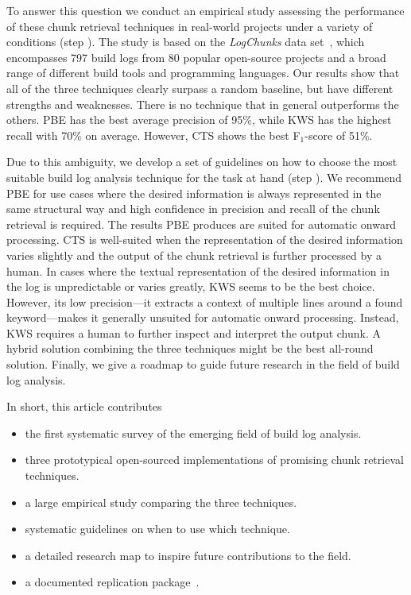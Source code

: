 To answer this question
we conduct an empirical study assessing the performance
of these chunk retrieval techniques in
real-world projects under a variety of conditions (step ).
The study is based on the \emph{LogChunks} data
set~\cite{brandt2020logchunks}, which encompasses 797 build logs from
80 popular open-source projects and a broad range of different
build tools and programming languages.
Our results show that all of the three techniques
clearly surpass a random baseline, but have different strengths and weaknesses. There is no technique that in general outperforms
the others.
PBE has the best average precision of 95\%, while KWS has the highest
recall with 70\% on average.
However, CTS shows the best F$_{1}$-score
of 51\%. 

Due to this ambiguity, we develop a set of guidelines
on how to choose the most suitable build log analysis
technique for the task at hand (step ).
We recommend PBE for use cases where the desired information is always
represented in the same structural way and high confidence in
precision and recall of the chunk retrieval is required.
The results PBE produces are suited for automatic onward processing.
CTS is
well-suited when the representation of the desired information varies
slightly and the output of the chunk retrieval is further processed by
a human.
In cases where the textual representation of the desired
information in the log is unpredictable or varies greatly, KWS seems
to be the best choice.
However, its low precision---it extracts a
context of multiple lines around a found keyword---makes it generally
unsuited for automatic onward processing.
Instead, KWS requires a human
to further inspect and interpret the output chunk.
A hybrid solution combining the three techniques might be the best
all-round solution.
Finally, we give a roadmap to guide future research in the field
of build log analysis.

In short, this article contributes
\begin{itemize}
\item the first systematic survey of the emerging field of build log
analysis.
\item three prototypical open-sourced implementations of
promising chunk retrieval techniques.
\item a large empirical study comparing the three techniques.
\item systematic guidelines on when to use which technique.
\item a detailed research map to inspire future contributions to the
field.
\item a documented replication package~\cite{brandt2020chunk-replication}.
\end{itemize}

